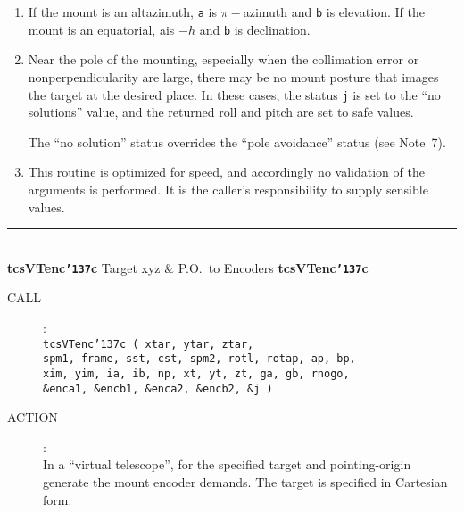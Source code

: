 \documentclass[12pt,fleqn,twoside]{article}
\renewcommand{\_}{{\tt\char'137}}     %
\newcommand{\routine}[2]
{
  \newpage
  \rule{\textwidth}{0.3mm}\\ \nopagebreak
  {\Large {\bf #1} \hfill #2 \hfill {\bf #1}}
  \vspace{-1ex}
}
\newcommand{\call}[1]
{
  \goodbreak
  \begin{description}
    \item[CALL]: \\[0.5ex] \nopagebreak
        {\tt #1}
  \end{description}
  \vspace{-3ex}
}
\newcommand{\action}[1]
{
  \goodbreak
  \begin{description}
    \item[ACTION]: \\[0.5ex] \nopagebreak
        #1
  \end{description}
  \vspace{-3ex}
}
\begin{document}
{\begin{enumerate}
      The argument {\tt rnogo} specifies how close to the pole of the
      mounting the target is allowed to be.  If the target is too
      close, the routine aims instead for a fictitious target further
      out, on the edge of the forbidden region.  A warning status is
      set when this ``pole avoidance'' action is taken.

      It is permissible to set {\tt rnogo} to zero, and to handle any pole
      problems in the TCS application itself.  Two strategies that
      might be considered as an alternative to the {\tt rnogo} approach are
      (i)~progressive scaling back of certain of the pointing
      coefficients so that close to the pole the mount becomes
      nominally perfect, and (ii)~substituting a fictitious target that
      makes the telescope loiter on the edge of the awkward region
      until the real target catches up.
\item If the mount is an altazimuth, {\tt a} is $\pi-$azimuth
      and {\tt b} is
      elevation.  If the mount is an equatorial, ais $-h$ and {\tt b} is
      declination.
\item Near the pole of the mounting, especially when the collimation
      error or nonperpendicularity are large, there may be no mount
      posture that images the target at the desired place.  In these
      cases, the status {\tt j} is set to the ``no solutions'' value, and the
      returned roll and pitch are set to safe values.

      The ``no solution'' status overrides the ``pole avoidance'' status
      (see Note~7).
\item This routine is optimized for speed, and accordingly no
      validation of the arguments is performed.  It is the caller's
      responsibility to supply sensible values.
\end{enumerate}
}
\routine{tcsVTenc\_c}{Target xyz \& P.O.\ to Encoders}
\label{tcsVTenc_c}
\call{tcsVTenc\_c ( xtar, ytar, ztar, \\
      \hspace*{6em} spm1, frame, sst, cst, spm2, rotl, rotap, ap, bp, \\
      \hspace*{6em} xim, yim, ia, ib, np,
                    xt, yt, zt, ga, gb, rnogo, \\
      \hspace*{6em} \&enca1, \&encb1, \&enca2, \&encb2, \&j ) }
\action{In a ``virtual telescope'', for the
        specified target and pointing-origin
        generate the mount encoder demands.  The target is
        specified in Cartesian form.}
\end{document}
